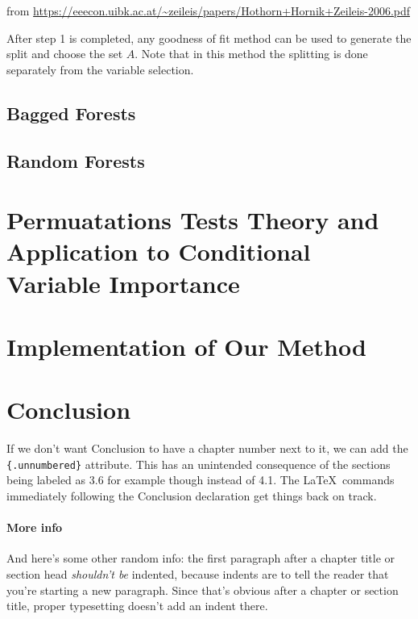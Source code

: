 \documentclass[12pt,twoside]{reedthesis}
\begin{document}
  from
  \url{https://eeecon.uibk.ac.at/~zeileis/papers/Hothorn+Hornik+Zeileis-2006.pdf}
  
  After step 1 is completed, any goodness of fit method can be used to
  generate the split and choose the set \(A\). Note that in this method
  the splitting is done separately from the variable selection.
  
  \section{Bagged Forests}\label{bagged-forests}
  
  \section{Random Forests}\label{random-forests}
  
  \chapter{Permuatations Tests Theory and Application to Conditional
  Variable
  Importance}\label{permuatations-tests-theory-and-application-to-conditional-variable-importance}
  
  \chapter{Implementation of Our
  Method}\label{implementation-of-our-method}
  
  \chapter*{Conclusion}\label{conclusion}
  
  \setcounter{chapter}{4} \setcounter{section}{0}
  
  If we don't want Conclusion to have a chapter number next to it, we can
  add the \texttt{\{.unnumbered\}} attribute. This has an unintended
  consequence of the sections being labeled as 3.6 for example though
  instead of 4.1. The \LaTeX~commands immediately following the Conclusion
  declaration get things back on track.
  
  \subsubsection{More info}\label{more-info}
  
  And here's some other random info: the first paragraph after a chapter
  title or section head \emph{shouldn't be} indented, because indents are
  to tell the reader that you're starting a new paragraph. Since that's
  obvious after a chapter or section title, proper typesetting doesn't add
  an indent there.
  
\end{document}
